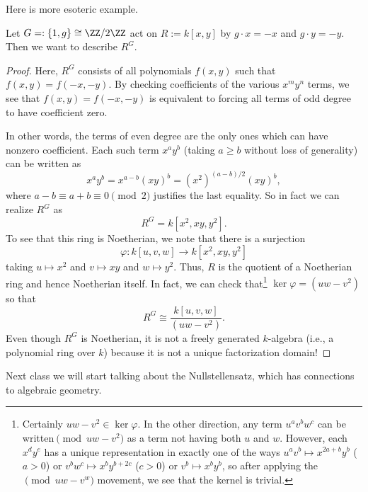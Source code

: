 Here is more esoteric example.
\begin{exe}
	Let $G=:\{1,g\}\cong\ZZ/2\ZZ$ act on $R:=k[x,y]$ by $g\cdot x=-x$ and $g\cdot y=-y$. Then we want to describe $R^G$.
\end{exe}
\begin{proof}
	Here, $R^G$ consists of all polynomials $f(x,y)$ such that $f(x,y)=f(-x,-y)$. By checking coefficients of the various $x^my^n$ terms, we see that $f(x,y)=f(-x,-y)$ is equivalent to forcing all terms of odd degree to have coefficient zero.
	
	In other words, the terms of even degree are the only ones which can have nonzero coefficient. Each such term $x^ay^b$ (taking $a\ge b$ without loss of generality) can be written as
	\[x^ay^b=x^{a-b}(xy)^b=\left(x^2\right)^{(a-b)/2}(xy)^b,\]
	where $a-b\equiv a+b\equiv0\pmod2$ justifies the last equality. So in fact we can realize $R^G$ as
	\[R^G=k\left[x^2,xy,y^2\right].\]
	To see that this ring is Noetherian, we note that there is a surjection
	\[\varphi:k[u,v,w]\to k\left[x^2,xy,y^2\right]\]
	taking $u\mapsto x^2$ and $v\mapsto xy$ and $w\mapsto y^2$. Thus, $R$ is the quotient of a Noetherian ring and hence Noetherian itself. In fact, we can check that\footnote{Certainly $uw-v^2\in\ker\varphi$. In the other direction, any term $u^av^bw^c$ can be written$\pmod{uw-v^2}$ as a term not having both $u$ and $w$. However, each $x^dy^e$ has a unique representation in exactly one of the ways $u^av^b\mapsto x^{2a+b}y^b$ ($a>0$) or $v^bw^c\mapsto x^by^{b+2c}$ ($c>0$) or $v^b\mapsto x^by^b$, so after applying the$\pmod{uw-v^w}$ movement, we see that the kernel is trivial.} $\ker\varphi=\left(uw-v^2\right)$ so that
	\[R^G\cong\frac{k[u,v,w]}{\left(uw-v^2\right)}.\]
	Even though $R^G$ is Noetherian, it is not a freely generated $k$-algebra (i.e., a polynomial ring over $k$) because it is not a unique factorization domain!
\end{proof}
Next class we will start talking about the Nullstellensatz, which has connections to algebraic geometry.
